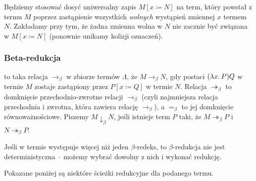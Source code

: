 \documentclass[polish,pretty]{angav}
\newcommand{\toto}{\twoheadrightarrow}
\begin{document}
Będziemy stosować dosyć uniwersalny zapis $M[x \coloneqq N]$ na term, który powstał z termu $M$ poprzez zastąpienie wszystkich \emph{wolnych} wystąpień zmiennej $x$ termem $N$.
Zakładamy przy tym, że żadna zmienna wolna w $N$ nie zacznie być związana w $M[x \coloneqq N]$ (ponownie unikamy kolizji oznaczeń).

\subsubsection*{Beta-redukcja}

 to taka relacja $\to_\beta$ w zbiorze termów $\Lambda$, że $M \to_\beta N$, gdy  postaci $(\lambda x\ldotp P)Q$ w termie $M$ zostaje zastąpiony przez $P[x \coloneqq Q]$ w termie $N$.
Relacja $\toto_\beta$ to domknięcie przechodnio-zwrotne relacji $\to_\beta$ (czyli najmniejsza relacja przechodnia i zwrotna, która zawiera relację $\to_\beta$), a $=_\beta$ to jej domknięcie równoważnościowe.
Piszemy $M \downarrow_\beta N$, jeśli istnieje term $P$ taki, że $M \toto_\beta P$ i $N \toto_\beta P$.

Jeśli w termie występuje więcej niż jeden $\beta$-redeks, to $\beta$-redukcja nie jest deterministyczna -- możemy wybrać dowolny z nich i wykonać redukcję.

\begin{example}
    \label{eq:beta-reduction}
    Pokazane poniżej są niektóre ścieżki redukcyjne dla podanego termu.
    \begin{center}
    \end{center}
\end{example}
\end{document}
